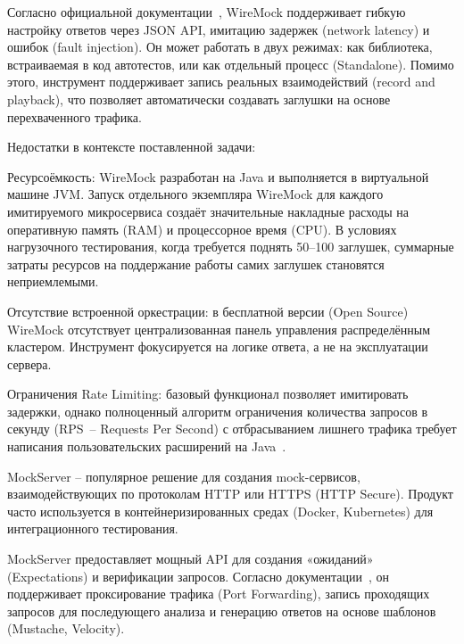 Согласно официальной документации~\cite{wiremock}, WireMock поддерживает гибкую настройку ответов через JSON API, имитацию задержек (network latency) и ошибок (fault injection). Он может работать в двух режимах: как библиотека, встраиваемая в код автотестов, или как отдельный процесс (Standalone). Помимо этого, инструмент поддерживает запись реальных взаимодействий (record and playback), что позволяет автоматически создавать заглушки на основе перехваченного трафика.

Недостатки в контексте поставленной задачи:
\begin{compactlist}
\item Ресурсоёмкость: WireMock разработан на Java и выполняется в виртуальной машине JVM. Запуск отдельного экземпляра WireMock для каждого имитируемого микросервиса создаёт значительные накладные расходы на оперативную память (RAM) и процессорное время (CPU). В условиях нагрузочного тестирования, когда требуется поднять 50--100 заглушек, суммарные затраты ресурсов на поддержание работы самих заглушек становятся неприемлемыми.
\item Отсутствие встроенной оркестрации: в бесплатной версии (Open Source) WireMock отсутствует централизованная панель управления распределённым кластером. Инструмент фокусируется на логике ответа, а не на эксплуатации сервера.
\item Ограничения Rate Limiting: базовый функционал позволяет имитировать задержки, однако полноценный алгоритм ограничения количества запросов в секунду (RPS~-- Requests Per Second) с отбрасыванием лишнего трафика требует написания пользовательских расширений на Java~\cite{wiremock}.
\end{compactlist}


MockServer -- популярное решение для создания mock-сервисов, взаимодействующих по протоколам HTTP или HTTPS (HTTP Secure). Продукт часто используется в контейнеризированных средах (Docker, Kubernetes) для интеграционного тестирования.

MockServer предоставляет мощный API для создания «ожиданий» (Expectations) и верификации запросов. Согласно документации~\cite{mockserver}, он поддерживает проксирование трафика (Port Forwarding), запись проходящих запросов для последующего анализа и генерацию ответов на основе шаблонов (Mustache, Velocity).

